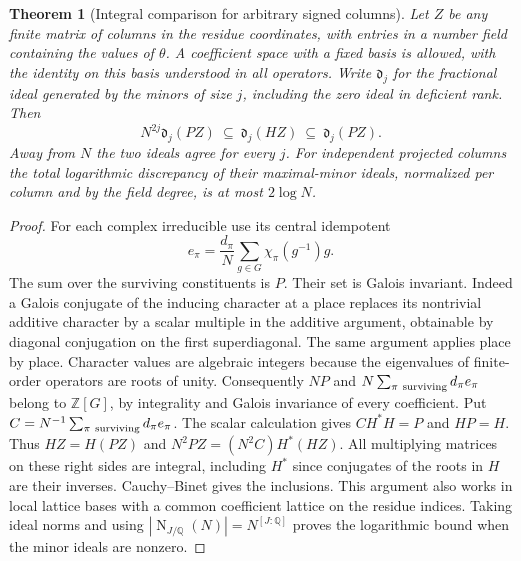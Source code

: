 \documentclass[a4paper,11pt]{article}
\newtheorem{theorem}[proposition]{Theorem}
\theoremstyle{definition}
\theoremstyle{remark}
\numberwithin{equation}{section}
\begin{document}
\begin{theorem}[Integral comparison for arbitrary signed columns]
\leavevmode\label{thm:whittakerintegral527}
Let \(Z\) be any finite matrix of columns in the residue coordinates,
with entries in a number field containing the values of \(\theta\).
A coefficient space with a fixed basis is allowed, with the identity
on this basis understood in all operators. Write \(\mathfrak d_j\)
for the fractional ideal generated by the minors of size \(j\),
including the zero ideal in deficient rank. Then
\[
     N^{2j}\mathfrak d_j(PZ)\ \subseteq\ \mathfrak d_j(HZ)
                          \ \subseteq\ \mathfrak d_j(PZ).
\]
Away from \(N\) the two ideals agree for every \(j\). For independent
projected columns the total logarithmic discrepancy of their
maximal-minor ideals, normalized per column and by the field degree,
is at most \(2\log N\).
\end{theorem}
\begin{proof}
For each complex irreducible use its central idempotent
\[
             e_\pi=\frac{d_\pi}{N}\sum_{g\in G}
                             \chi_\pi(g^{-1})g .
\]
The sum over the surviving constituents is \(P\). Their set is
Galois invariant. Indeed a Galois conjugate of the inducing
character at a place replaces its nontrivial additive character
by a scalar multiple in the additive argument, obtainable by
diagonal conjugation on the first superdiagonal. The same argument
applies place by place. Character values are algebraic integers
because the eigenvalues of finite-order operators are roots of unity.
Consequently \(NP\) and
\(N\sum_{\pi\ {\rm surviving}}d_\pi e_\pi\) belong to
\(\mathbb Z[G]\), by integrality and Galois invariance of every
coefficient. Put \(C=N^{-1}\sum_{\pi\ {\rm surviving}} d_\pi e_\pi\).
The scalar calculation gives \(CH^*H=P\) and \(HP=H\).
Thus \(HZ=H(PZ)\) and \(N^2PZ=(N^2 C)H^*(HZ)\).
All multiplying matrices on these right sides are integral,
including \(H^*\) since conjugates of the roots in \(H\) are
their inverses. Cauchy--Binet gives the inclusions. This argument
also works in local lattice bases with a common coefficient lattice
on the residue indices. Taking ideal norms and using
\(|\operatorname{N}_{J/\mathbb Q}(N)|=N^{[J:\mathbb Q]}\)
proves the logarithmic bound when the minor ideals are nonzero.
\end{proof}
\end{document}
